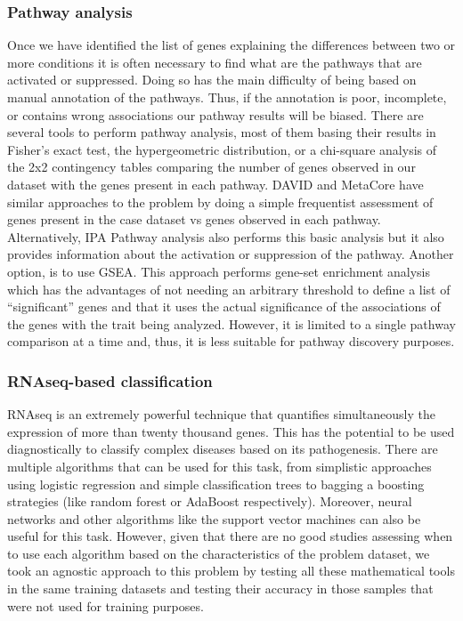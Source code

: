 \subsubsection{Pathway analysis}
Once we have identified the list of genes explaining the differences between two or more conditions it is often necessary to find what are the pathways that are activated or suppressed. Doing so has the main difficulty of being based on manual annotation of the pathways. Thus, if the annotation is poor, incomplete, or contains wrong associations our pathway results will be biased. There are several tools to perform pathway analysis, most of them basing their results in Fisher’s exact test, the hypergeometric distribution, or a chi-square analysis of the 2x2 contingency tables comparing the number of genes observed in our dataset with the genes present in each pathway. DAVID and MetaCore have similar approaches to the problem by doing a simple frequentist assessment of genes present in the case dataset vs genes observed in each pathway. Alternatively, IPA Pathway analysis also performs this basic analysis but it also provides information about the activation or suppression of the pathway. Another option, is to use GSEA. This approach performs gene-set enrichment analysis which has the advantages of not needing an arbitrary threshold to define a list of “significant” genes and that it uses the actual significance of the associations of the genes with the trait being analyzed. However, it is limited to a single pathway comparison at a time and, thus, it is less suitable for pathway discovery purposes.

\subsubsection{RNAseq-based classification}
RNAseq is an extremely powerful technique that quantifies simultaneously the expression of more than twenty thousand genes. This has the potential to be used diagnostically to classify complex diseases based on its pathogenesis. There are multiple algorithms that can be used for this task, from simplistic approaches using logistic regression and simple classification trees to bagging a boosting strategies (like random forest or AdaBoost respectively). Moreover, neural networks and other algorithms like the support vector machines can also be useful for this task. However, given that there are no good studies assessing when to use each algorithm based on the characteristics of the problem dataset, we took an agnostic approach to this problem by testing all these mathematical tools in the same training datasets and testing their accuracy in those samples that were not used for training purposes.

